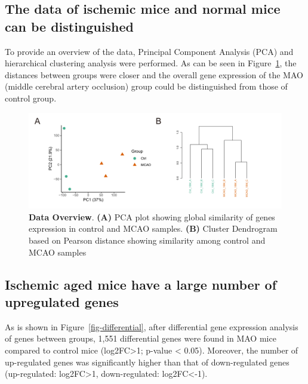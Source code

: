\documentclass[
  a4paper,
]{article}
\begin{document}
\hypertarget{the-data-of-ischemic-mice-and-normal-mice-can-be-distinguished}{%
\subsection{The data of ischemic mice and normal mice can be
distinguished}\label{the-data-of-ischemic-mice-and-normal-mice-can-be-distinguished}}

To provide an overview of the data, Principal Component Analysis (PCA)
and hierarchical clustering analysis were performed. As can be seen in
Figure~\ref{fig-overview}, the distances between groups were closer and
the overall gene expression of the MAO (middle cerebral artery
occlusion) group could be distinguished from those of control group.

\begin{figure}[H]

{\centering \includegraphics{./figure/Figure-2.pdf}

}

\caption{\label{fig-overview}\textbf{Data Overview}. \textbf{(A)} PCA
plot showing global similarity of genes expression in control and MCAO
samples. \textbf{(B)} Cluster Dendrogram based on Pearson distance
showing similarity among control and MCAO samples}

\end{figure}

\hypertarget{ischemic-aged-mice-have-a-large-number-of-upregulated-genes}{%
\subsection{Ischemic aged mice have a large number of upregulated
genes}\label{ischemic-aged-mice-have-a-large-number-of-upregulated-genes}}

As is shown in Figure~\ref{fig-differential}, after differential gene
expression analysis of genes between groups, 1,551 differential genes
were found in MAO mice compared to control mice
(\textbar log2FC\textbar\textgreater1; p-value \textless{} 0.05).
Moreover, the number of up-regulated genes was significantly higher than
that of down-regulated genes (up-regulated: log2FC\textgreater1,
down-regulated: log2FC\textless-1).
\end{document}
